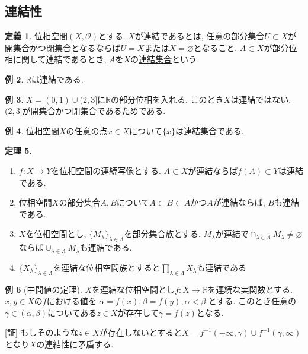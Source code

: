 \documentclass[dvipdfmx,a4paper,11pt]{article}
\newcommand{\R}{\mathbb{R}}
\theoremstyle{definition}
\newtheorem{thm}{定理}
\newtheorem{dfn}[thm]{定義}
\newtheorem{exa}[thm]{例}
\begin{document}
   
\subsection{連結性}
   
  \begin{tcolorbox}[
    colback = white,
    colframe = green!35!black,
    fonttitle = \bfseries,
    breakable = true]
    \begin{dfn}
位相空間$(X, \mathscr{O})$とする. $X$が\underline{連結}であるとは, 任意の部分集合$U \subset X$が開集合かつ閉集合となるならば$U = X$または$X = \varnothing$となること.
$A \subset X$が部分位相に関して連結であるとき, $A$を$X$の\underline{連結集合}という
  \end{dfn}
    \end{tcolorbox}
 \begin{exa}
  $\R$は連結である. 
 \end{exa}

 \begin{exa}
$X = (0,1) \cup (2,3]$に$\R$の部分位相を入れる. このとき$X$は連結ではない.
$(2,3]$が開集合かつ閉集合であるためである.
 \end{exa}
  \begin{exa}
位相空間$X$の任意の点$x \in X$について$\{ x\}$は連結集合である.
 \end{exa}
  \begin{tcolorbox}[
    colback = white,
    colframe = green!35!black,
    fonttitle = \bfseries,
    breakable = true]
    \begin{thm}
    \text{}
     \begin{enumerate}
      \setlength{\parskip}{0cm} 
  \setlength{\itemsep}{0cm} 
  \item $f : X \rightarrow Y$を位相空間の連続写像とする. $A \subset X$が連結ならば$f(A) \subset Y$は連結である.
  \item 位相空間$X$の部分集合$A,B$について$A \subset B \subset \overline{A}$かつ$A$が連結ならば, $B$も連結である.
  \item $X$を位相空間とし, $\{M_{\lambda} \}_{\lambda \in \Lambda}$を部分集合族とする. $M_{\lambda}$が連結で$ \cap_{\lambda \in \Lambda} M_{\lambda} \neq \varnothing$ならば$\cup_{\lambda \in \Lambda} M_{\lambda}$も連結である.
 \item $\{ X_{\lambda}\}_{\lambda \in \Lambda}$を連結な位相空間族とすると$\prod_{\lambda \in \Lambda}X_{\lambda}$も連結である
    \end{enumerate}
  \end{thm}
   \end{tcolorbox}
   \begin{exa}[中間値の定理]
   $X$を連結な位相空間とし$f : X \rightarrow \R$を連続な実関数とする. $x,y \in X$の$f$における値を
   $\alpha =f(x), \beta=f(y), \alpha < \beta$
   とする. このとき任意の$\gamma \in (\alpha, \beta)$についてある$z \in X$が存在して$\gamma =f(z)$となる.
   
   [証] もしそのような$z \in X$が存在しないとすると$X = f^{-1}(- \infty, \gamma) \cup f^{-1}( \gamma,\infty) $となり$X$の連結性に矛盾する.
   \end{exa}
\end{document}
